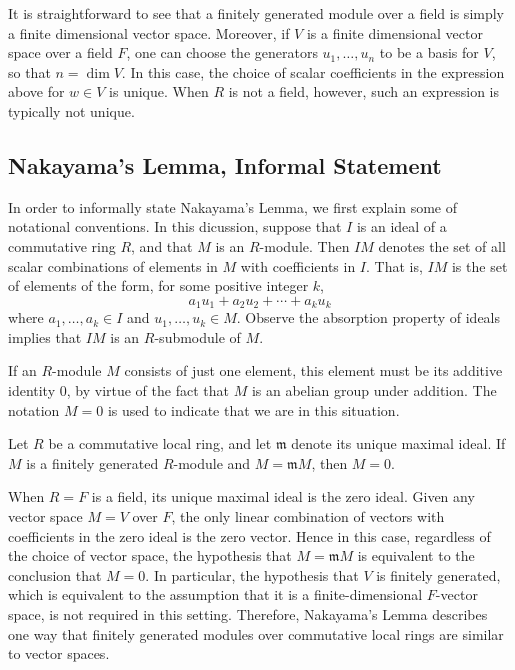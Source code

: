 \documentclass{article}
\begin{document}
It is straightforward to see that a finitely generated module over a field is  
simply a finite dimensional vector space.
Moreover, if $V$ is a finite dimensional vector space over a field 
$F$, one can choose the generators $u_1, \ldots, u_n$ to be a basis for $V$, so that  
$n = \dim V$. In this case, the choice of scalar coefficients in the expression
above for $w \in V$ is unique. When $R$ is not a field, however, such an
expression is typically not unique. 


\subsection{Nakayama's Lemma, Informal Statement}

In order to informally state Nakayama's Lemma, we first explain some of notational 
conventions.  In this dicussion, suppose that  $I$ is an ideal of a commutative ring $R$, 
and that $M$ is an $R$-module. Then $IM$ denotes the set of all scalar combinations of 
elements in $M$ with coefficients in $I$.  That is, $IM$ is the set of  elements of the form, 
for some positive integer $k$,
 \[a_1 u_1 + a_2 u_2 + \cdots + a_k u_k\] 
where $a_1, \ldots, a_k \in I$ and
$u_1, \ldots, u_k \in M$. Observe the absorption property of ideals implies that 
$I M$ is an $R$-submodule of $M$. 

If an $R$-module $M$ consists of just one element, this element must be its
additive identity $0$, by virtue of the fact that $M$ is an abelian group under addition. 
The notation $M=0$ is used to indicate that we are in this situation. 

\begin{nak*}
Let $R$ be a commutative local ring, and let $\mathfrak{m}$ denote its unique
maximal ideal. If $M$ is a finitely generated $R$-module and
$M = \mathfrak{m} M$, then $M = 0$. 
\end{nak*}

When $R=F$ is a field, its unique maximal ideal is the zero ideal.  
Given any vector space $M=V$ over $F$, the only linear combination of vectors with
coefficients in the zero ideal is the zero vector. Hence in this case, regardless of the choice of 
vector space, the hypothesis that  $M = \mathfrak{m} M$ is equivalent to the conclusion that
$M=0$. 
In particular, the hypothesis that $V$ is finitely generated, which is equivalent to the
assumption that it is a finite-dimensional $F$-vector space, is not required in this setting. 
Therefore, Nakayama's Lemma describes one way that finitely generated modules
over commutative local rings are similar to vector spaces. 
\end{document}
